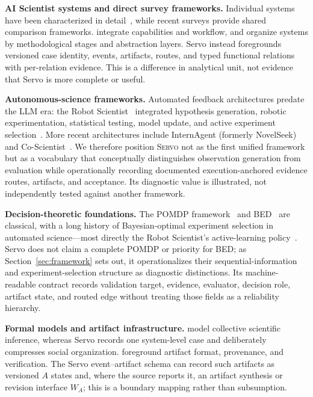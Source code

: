 \documentclass{article}
\newcommand{\framework}{\textsc{Servo}}
\begin{document}
\textbf{AI Scientist systems and direct survey frameworks.} Individual systems have been characterized in detail~\citep{lu2024aiscientist,lu2026aiscientist,schmidgall2025agentlab,boiko2023emergent}, while recent surveys provide shared comparison frameworks. \citet{wei2025agenticscience} integrate capabilities and workflow, and \citet{tie2025survey} organize systems by methodological stages and abstraction layers. Servo instead foregrounds versioned case identity, events, artifacts, routes, and typed functional relations with per-relation evidence. This is a difference in analytical unit, not evidence that Servo is more complete or useful.

\textbf{Autonomous-science frameworks.} Automated feedback architectures predate the LLM era: the Robot Scientist~\citep{sparkes2010robot} integrated hypothesis generation, robotic experimentation, statistical testing, model update, and active experiment selection~\citep{king2004robot}. More recent architectures include InternAgent (formerly NovelSeek)~\citep{zhang2025novelseek} and Co-Scientist~\citep{gottweis2026coscientist}. We therefore position \framework{} not as the first unified framework but as a vocabulary that conceptually distinguishes observation generation from evaluation while operationally recording documented execution-anchored evidence routes, artifacts, and acceptance. Its diagnostic value is illustrated, not independently tested against another framework.

\textbf{Decision-theoretic foundations.} The POMDP framework~\citep{kaelbling1998pomdp} and BED~\citep{chaloner1995bayesian,rainforth2024modern} are classical, with a long history of Bayesian-optimal experiment selection in automated science---most directly the Robot Scientist's active-learning policy~\citep{king2004robot}. Servo does not claim a complete POMDP or priority for BED; as Section~\ref{sec:framework} sets out, it operationalizes their sequential-information and experiment-selection structure as diagnostic distinctions. Its machine-readable contract records validation target, evidence, evaluator, decision role, artifact state, and routed edge without treating those fields as a reliability hierarchy.

\textbf{Formal models and artifact infrastructure.} \citet{taniguchi2024cpc} model collective scientific inference, whereas Servo records one system-level case and deliberately compresses social organization. \citet{liu2026lasthuman} foreground artifact format, provenance, and verification. The Servo event--artifact schema can record such artifacts as versioned $A$ states and, where the source reports it, an artifact synthesis or revision interface $W_A$; this is a boundary mapping rather than subsumption.
\end{document}
